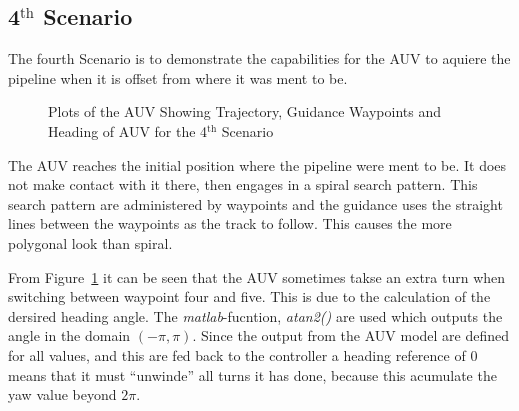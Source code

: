	
	
	\subsection{4$^{\mathrm{th}}$ Scenario}
		The fourth Scenario is to demonstrate the capabilities for the AUV to aquiere the pipeline
		when it is offset from where it was ment to be. 
		
		\begin{figure}[htbp]
			\centering
			\caption{Plots of the AUV Showing Trajectory, Guidance Waypoints and Heading of AUV
			for the 4$^{\mathrm{th}}$ Scenario}
			\label{fig:ch3_4th_NE_plots}
		\end{figure}
		The AUV reaches the initial position where the pipeline were ment to be. It does not make
		contact with it there, then engages in a spiral search pattern. This search pattern are
		administered by waypoints and the guidance uses the straight lines between the waypoints as
		the track to follow. This causes the more polygonal look than spiral. 

		From Figure~\ref{fig:ch3_4th_NE_plots} it can be seen that the AUV sometimes takse an extra turn
		when switching between waypoint four and five. This is due to the calculation of the dersired heading
		angle. The \textit{matlab}-fucntion, \textit{atan2()} are used which outputs the angle in the
		domain $(-\pi, \pi)$. Since the output from the AUV model are defined for all values, and this
		are fed back to the controller a heading reference of 0 means that it must ``unwinde'' all
		turns it has done, because this acumulate the yaw value beyond $2\pi$.

